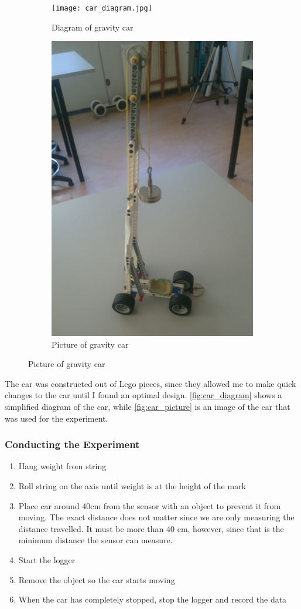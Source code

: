 \documentclass[titlepage,12pt]{article}
\begin{document}
\begin{figure}[H]
    \hspace*{-1.3in}
    \begin{subfigure}{.5\paperwidth}
        \centering
        \texttt{[image: car\_diagram.jpg]}
        \caption{Diagram of gravity car}
        \label{fig:car_diagram}
    \end{subfigure}%
    \begin{subfigure}{.5\paperwidth}
        \centering
        \includegraphics[width=.5\linewidth]{photo_overview.jpg}
        \caption{Picture of gravity car}
        \label{fig:car_picture}
    \end{subfigure}
\end{figure}
%
The car was constructed out of Lego pieces, since they allowed me to make quick changes to
the car until I found an optimal design. \autoref{fig:car_diagram} shows a simplified
diagram of the car, while \autoref{fig:car_picture} is an image of the car that was used for
the experiment.
    
\subsubsection{Conducting the Experiment}

\begin{enumerate}
    \item Hang weight from string
    \item Roll string on the axis until weight is at the height of the mark
    \item Place car around 40cm from the sensor with an object to prevent it from moving.
        The exact distance does not matter since we are only measuring the distance
        travelled. It must be more than 40 cm, however, since that is the minimum distance
        the sensor can measure.  
    \item Start the logger
    \item Remove the object so the car starts moving
    \item When the car has completely stopped, stop the logger and record the data
\end{enumerate}
\end{document}

